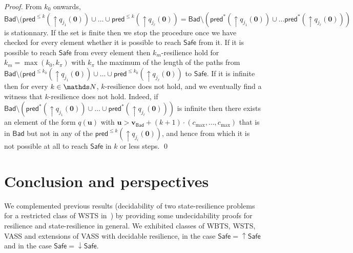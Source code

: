 \documentclass[runningheads]{llncs}
\newcommand{\pred}{\textsf{pred}}
\newcommand{\Bad}{\textsf{Bad}}
\newcommand{\Safe}{\textsf{Safe}}
\begin{document}
\begin{proof}
From $k_0$ onwards,
$\Bad \setminus (\pred^{\leq k}(\mathop{\uparrow} q_{j_1}(\textbf{0}))\cup \ldots \cup \pred^{\leq k}(\mathop{\uparrow} q_{j_\ell}(\textbf{0}))= 
\Bad \setminus (\pred^{*}(\mathop{\uparrow} q_{j_1}(\textbf{0})) \cup \ldots \pred^{*}(\mathop{\uparrow} q_{j_\ell}(\textbf{0})) )$
is stationnary. 
If the set is finite then we stop the procedure once we have checked for every element
whether it is possible to reach $\Safe$ from it.
If it is possible to reach $\Safe$ from every element then {\sc $k_m$-resilience}
hold
for $k_m = \max(k_0, k_{\pi})$ with 
$k_{\pi}$ the maximum of the length of the paths from 
$\Bad \setminus (\pred^{\leq k_0}(\mathop{\uparrow} q_{j_1}(\textbf{0}))\cup \ldots \cup \pred^{\leq k_0}(\mathop{\uparrow} q_{j_\ell}(\textbf{0}))$ to $\Safe$.
If it is infinite then
for every $k \in \N$,
$k$-resilience does not hold, 
and we eventually find a witness that $k$-resilience does not hold.
Indeed, 
if
$\Bad \setminus (\pred^{*}(\mathop{\uparrow} q_{j_1}(\textbf{0})) \cup \ldots \cup \pred^{*}(\mathop{\uparrow} q_{j_\ell}(\textbf{0})) )$
is
infinite
then
there exists an element of the form $q(\textbf{u} )$
with $\textbf{u} > \textbf{v}_{\Bad} + (k+1) \cdot (c_{\max}, \ldots, c_{\max})$ 
that is in $\Bad$ but not in any of the $\pred^{\leq k}(\mathop{\uparrow} q_{j_i}(\textbf{0}))$,
and hence from which it is not possible at all to reach
$\Safe$ in $k$ or less steps.
\qed
\end{proof}









\section{Conclusion and perspectives}

We complemented previous results (decidability of two state-resilience problems for a restricted class of WSTS in~\cite{DBLP:journals/corr/PrasadZ16,DBLP:journals/corr/abs-2108-00889,DBLP:conf/gg/Ozkan22}) by providing some undecidability proofs for resilience and state-resilience in general. We exhibited classes of WBTS, WSTS, VASS and extensions of VASS with decidable resilience, in the case 
 $\Safe = \mathop{\uparrow} \Safe$ and in the case 
 $\Safe = \mathop{\downarrow} \Safe$.
\end{document}
